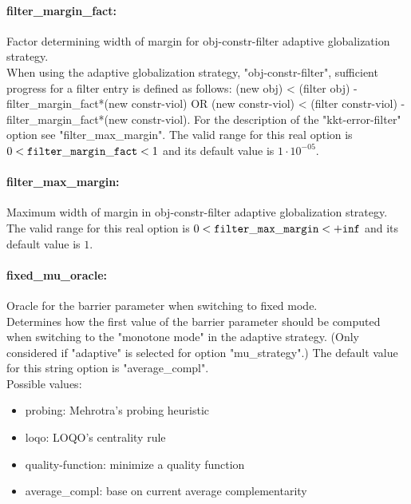 \paragraph{filter\_margin\_fact:}\label{opt:filter_margin_fact} Factor determining width of margin for obj-constr-filter adaptive globalization strategy. \\
 When using the adaptive globalization strategy, "obj-constr-filter", sufficient progress for a filter entry is defined as follows: (new obj) < (filter obj) - filter\_margin\_fact*(new constr-viol) OR (new constr-viol) < (filter constr-viol) - filter\_margin\_fact*(new constr-viol).  For the description of the "kkt-error-filter" option see "filter\_max\_margin". The valid range for this real option is 
$0 <  {\tt filter\_margin\_fact } <  1$
and its default value is $1 \cdot 10^{-05}$.


\paragraph{filter\_max\_margin:}\label{opt:filter_max_margin} Maximum width of margin in obj-constr-filter adaptive globalization strategy. \\
 The valid range for this real option is 
$0 <  {\tt filter\_max\_margin } <  {\tt +inf}$
and its default value is $1$.


\paragraph{fixed\_mu\_oracle:}\label{opt:fixed_mu_oracle} Oracle for the barrier parameter when switching to fixed mode. \\
 Determines how the first value of the barrier parameter should be computed when switching to the "monotone mode" in the adaptive strategy. (Only considered if "adaptive" is selected for option "mu\_strategy".) The default value for this string option is "average\_compl".
\\ 
Possible values:
\begin{itemize}
   \item probing: Mehrotra's probing heuristic
   \item loqo: LOQO's centrality rule
   \item quality-function: minimize a quality function
   \item average\_compl: base on current average complementarity
\end{itemize}

